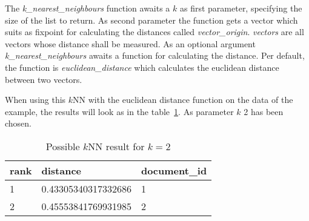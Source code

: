 The \textit{k\_nearest\_neighbours} function awaits a $k$ as first parameter, specifying the size of the list to return.
As second parameter the function gets a vector which suits as fixpoint for calculating the distances called \textit{vector\_origin}.
\textit{vectors} are all vectors whose distance shall be measured.
As an optional argument \textit{k\_nearest\_neighbours} awaits a function for calculating the distance.
Per default, the function is \textit{euclidean\_distance} which calculates the euclidean distance between two vectors.

When using this $k$NN with the euclidean distance function on the data of the example, the results will look as in the table~\ref{tab:knn-result}.
As parameter $k$ 2 has been chosen.



\begin{table}
    \center
    \begin{tabular}{ l | l | l }
        \rowcolor{\dustRowHead}
        rank    & distance              & document\_id\\\hline
        1       & 0.43305340317332686   & 1\\
        2       & 0.45553841769931985   & 2\\
    \end{tabular}
    \caption{Possible $k$NN result for $k=2$}
    \label{tab:knn-result}
\end{table}
